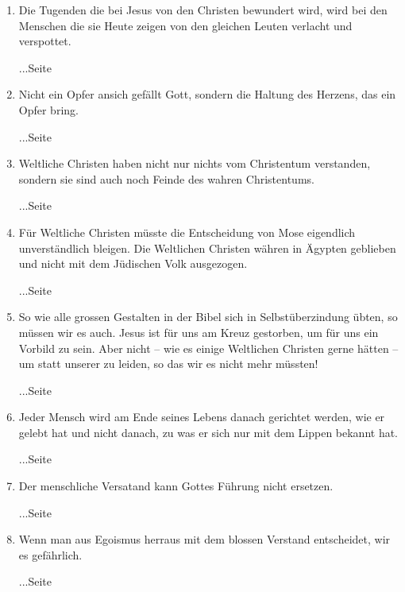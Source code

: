 \begin{enumerate}
 \item Die Tugenden die bei Jesus von den Christen bewundert wird, wird bei den
Menschen die sie Heute zeigen von den gleichen Leuten verlacht und verspottet.
 \begin{flushright}...Seite \pageref{ref:04_10_pilger}\end{flushright}
 \item Nicht ein Opfer ansich gefällt Gott, sondern die Haltung des Herzens, das
ein Opfer bring.
 \begin{flushright}...Seite \pageref{ref:04_13_opfer}\end{flushright}
 \item Weltliche Christen haben nicht nur nichts vom Christentum verstanden,
sondern sie sind auch noch Feinde des wahren Christentums.
 \begin{flushright}...Seite
\pageref{ref:04_13_weltliche_christen}\end{flushright}
 \item Für Weltliche Christen müsste die Entscheidung von Mose eigendlich
unverständlich bleigen. Die Weltlichen Christen währen in Ägypten geblieben und
nicht mit dem Jüdischen Volk ausgezogen.
 \begin{flushright}...Seite \pageref{ref:04_17_mose}\end{flushright}
 \item So wie alle grossen Gestalten in der Bibel sich in Selbstüberzindung
übten, so müssen wir es auch. Jesus ist für uns am Kreuz gestorben, um für uns
ein Vorbild zu sein. Aber nicht -- wie es einige Weltlichen Christen gerne
hätten -- um statt unserer zu leiden, so das wir es nicht mehr müssten!
 \begin{flushright}...Seite \pageref{ref:04_20_opfertod}\end{flushright}
 \item Jeder Mensch wird am Ende seines Lebens danach gerichtet werden, wie er
gelebt hat und nicht danach, zu was er sich nur mit dem Lippen bekannt hat.
 \begin{flushright}...Seite \pageref{ref:04_21_gericht}\end{flushright}
 \item Der menschliche Versatand kann Gottes Führung nicht ersetzen.
 \begin{flushright}...Seite \pageref{ref:04_22_vernunft}\end{flushright}
 \item Wenn man aus Egoismus herraus mit dem blossen Verstand entscheidet, wir
es gefährlich.
 \begin{flushright}...Seite \pageref{ref:04_22_vernunft_und_ego}\end{flushright}

\end{enumerate}
